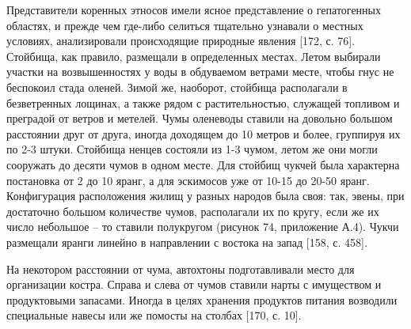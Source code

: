 Представители коренных этносов имели ясное представление о гепатогенных областях, и прежде чем где-либо селиться тщательно узнавали о местных условиях,
анализировали происходящие природные явления [172, с. 76]. Стойбища, как правило, размещали в определенных местах.
Летом выбирали участки на возвышенностях у воды в обдуваемом ветрами месте, чтобы гнус не беспокоил стада оленей.
Зимой же, наоборот, стойбища располагали в безветренных лощинах, а также рядом с растительностью, служащей топливом и преградой от ветров и метелей.
Чумы оленеводы ставили на довольно большом расстоянии друг от друга, иногда доходящем до 10 метров и более, группируя их по 2-3 штуки.
Стойбища ненцев состояли из 1-3 чумом, летом же они могли сооружать до десяти чумов в одном месте. Для стойбищ чукчей была характерна постановка от 2 до 10 яранг, а для эскимосов уже от 10-15 до 20-50 яранг.
Конфигурация расположения жилищ у разных народов была своя: так, эвены, при достаточно большом количестве чумов, располагали их по кругу, если же их число небольшое – то ставили полукругом (рисунок 74, приложение А.4). Чукчи размещали яранги линейно в направлении с востока на запад [158, с. 458].

На некотором расстоянии от чума, автохтоны подготавливали место для организации костра. Справа и слева от чумов ставили нарты с имуществом и продуктовыми запасами.
Иногда в целях хранения продуктов питания возводили специальные навесы или же помосты на столбах [170, с. 10].